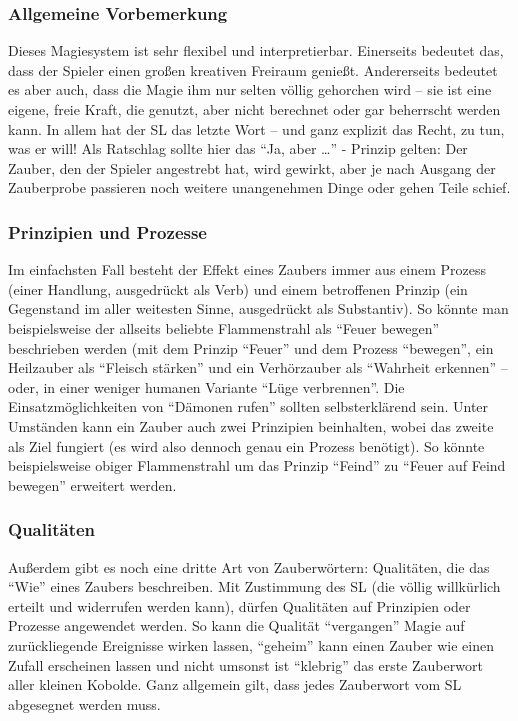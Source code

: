  
\subsubsection{Allgemeine Vorbemerkung}

Dieses Magiesystem ist sehr flexibel und interpretierbar. Einerseits bedeutet das, dass der Spieler einen großen kreativen Freiraum genießt. Andererseits bedeutet es aber auch, dass die Magie ihm nur selten völlig gehorchen wird -- sie ist eine eigene, freie Kraft, die genutzt, aber nicht berechnet oder gar beherrscht werden kann. In allem hat der SL das letzte Wort -- und ganz explizit das Recht, zu tun, was er will! Als Ratschlag sollte hier das "`Ja, aber \dots"' - Prinzip gelten: Der Zauber, den der Spieler angestrebt hat, wird gewirkt, aber je nach Ausgang der Zauberprobe passieren noch weitere unangenehmen Dinge oder gehen Teile schief.

\subsubsection{Prinzipien und Prozesse}

Im einfachsten Fall besteht der Effekt eines Zaubers immer aus einem Prozess (einer Handlung, ausgedrückt als Verb) und einem betroffenen Prinzip (ein Gegenstand im aller weitesten Sinne, ausgedrückt als Substantiv). So könnte man beispielsweise der allseits beliebte Flammenstrahl als "`Feuer bewegen"' beschrieben werden (mit dem Prinzip "`Feuer"' und dem Prozess "`bewegen"', ein Heilzauber als "`Fleisch stärken"' und ein Verhörzauber als "`Wahrheit erkennen"' -- oder, in einer weniger humanen Variante "`Lüge verbrennen"'. Die Einsatzmöglichkeiten von "`Dämonen rufen"' sollten selbsterklärend sein.
Unter Umständen kann ein Zauber auch zwei Prinzipien beinhalten, wobei das zweite als Ziel fungiert (es wird also dennoch genau ein Prozess benötigt). So könnte beispielsweise obiger Flammenstrahl um das Prinzip "`Feind"' zu "`Feuer auf Feind bewegen"' erweitert werden.

\subsubsection{Qualitäten}

Außerdem gibt es noch eine dritte Art von Zauberwörtern: Qualitäten, die das "`Wie"' eines Zaubers beschreiben. Mit Zustimmung des SL (die völlig willkürlich erteilt und widerrufen werden kann), dürfen Qualitäten auf Prinzipien oder Prozesse angewendet werden. So kann die Qualität "`vergangen"' Magie auf zurückliegende Ereignisse wirken lassen, "`geheim"' kann einen Zauber wie einen Zufall erscheinen lassen und nicht umsonst ist "`klebrig"' das erste Zauberwort aller kleinen Kobolde.
Ganz allgemein gilt, dass jedes Zauberwort vom SL abgesegnet werden muss.

